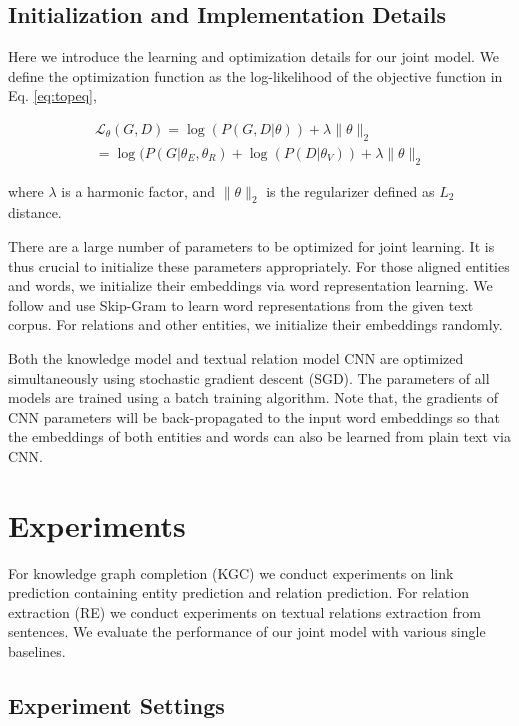 \documentclass[11pt,a4paper]{article}
\begin{document}
\subsection{Initialization and Implementation Details}
\label{sec:detail}
Here we introduce the learning and optimization details for our joint model. We define the optimization function as the log-likelihood of the objective function in Eq. \ref{eq:topeq},

\begin{align}
\mathcal{L}_{\theta}(G, D) = \log(P(G,D|{\theta})) + \lambda \lVert \theta \rVert_2 \\\nonumber
 = \log(P(G|{\theta_E, \theta_R}) + \log(P(D|{\theta_V})) + \lambda \lVert \theta \rVert_2
\end{align}

where $\lambda$ is a harmonic factor, and $\lVert \theta \rVert_2$ is the regularizer defined as $L_2$ distance.

There are a large number of parameters to be optimized for joint learning. It is thus crucial to initialize these parameters appropriately. For those aligned entities and words, we initialize their embeddings via word representation learning. We follow \cite{mikolov2013linguistic} and use Skip-Gram to learn word representations from the given text corpus. For relations and other entities, we initialize their embeddings randomly.

Both the knowledge model and textual relation model CNN are optimized simultaneously using stochastic gradient descent (SGD). The parameters of all models are trained using a batch training algorithm. Note that, the gradients of CNN parameters will be back-propagated to the input word embeddings so that the embeddings of both entities and words can also be learned from plain text via CNN.


\section{Experiments}

For knowledge graph completion (KGC) we conduct experiments on link prediction containing entity prediction and relation prediction. For relation extraction (RE) we conduct experiments on textual relations extraction from sentences. We evaluate the performance of our joint model with various single baselines. 

\subsection{Experiment Settings}
\end{document}
